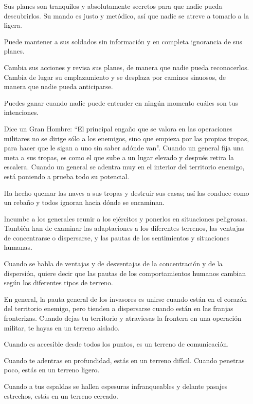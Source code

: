 Sus planes son tranquilos y absolutamente secretos para que nadie pueda descubrirlos. Su mando es justo y metódico, así que nadie se atreve a tomarlo a la ligera.

Puede mantener a sus soldados sin información y en completa ignorancia de sus planes.

Cambia sus acciones y revisa sus planes, de manera que nadie pueda reconocerlos. Cambia de lugar su emplazamiento y se desplaza por caminos sinuosos, de manera que nadie pueda anticiparse.

Puedes ganar cuando nadie puede entender en ningún momento cuáles son tus intenciones.

Dice un Gran Hombre: ``El principal engaño que se valora en las operaciones militares no se dirige sólo a los enemigos, sino que empieza por las propias tropas, para hacer que le sigan a uno sin saber adónde van''. Cuando un general fija una meta a sus tropas, es como el que sube a un lugar elevado y después retira la escalera. Cuando un general se adentra muy en el interior del territorio enemigo, está poniendo a prueba todo su potencial.

Ha hecho quemar las naves a sus tropas y destruir sus casas; así las conduce como un rebaño y todos ignoran hacia dónde se encaminan.

Incumbe a los generales reunir a los ejércitos y ponerlos en situaciones peligrosas. También han de examinar las adaptaciones a los diferentes terrenos, las ventajas de concentrarse o dispersarse, y las pautas de los sentimientos y situaciones humanas.

Cuando se habla de ventajas y de desventajas de la concentración y de la dispersión, quiere decir que las pautas de los comportamientos humanos cambian según los diferentes tipos de terreno.

En general, la pauta general de los invasores es unirse cuando están en el corazón del territorio enemigo, pero tienden a dispersarse cuando están en las franjas fronterizas. Cuando dejas tu territorio y atraviesas la frontera en una operación militar, te hayas en un terreno aislado.

Cuando es accesible desde todos los puntos, es un terreno de comunicación.

Cuando te adentras en profundidad, estás en un terreno difícil. Cuando penetras poco, estás en un terreno ligero.

Cuando a tus espaldas se hallen espesuras infranqueables y delante pasajes estrechos, estás en un terreno cercado.

